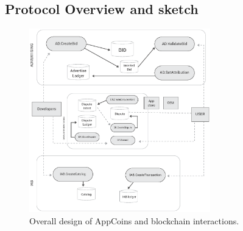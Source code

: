 \subsection{Protocol Overview and sketch}


\begin{figure}[!ht]
\centering
\includegraphics[width=0.7\textwidth]{diagrams/design.eps}
\caption{Overall design of AppCoins and blockchain interactions.}
\label{fig:design}
\end{figure}






%


